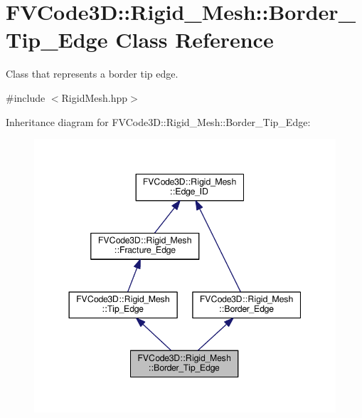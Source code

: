 \hypertarget{classFVCode3D_1_1Rigid__Mesh_1_1Border__Tip__Edge}{}\section{F\+V\+Code3D\+:\+:Rigid\+\_\+\+Mesh\+:\+:Border\+\_\+\+Tip\+\_\+\+Edge Class Reference}
\label{classFVCode3D_1_1Rigid__Mesh_1_1Border__Tip__Edge}


Class that represents a border tip edge.  




{\ttfamily \#include $<$Rigid\+Mesh.\+hpp$>$}



Inheritance diagram for F\+V\+Code3D\+:\+:Rigid\+\_\+\+Mesh\+:\+:Border\+\_\+\+Tip\+\_\+\+Edge\+:
\nopagebreak
\begin{figure}[H]
\begin{center}
\leavevmode
\includegraphics[width=344pt]{classFVCode3D_1_1Rigid__Mesh_1_1Border__Tip__Edge__inherit__graph}
\end{center}
\end{figure}


